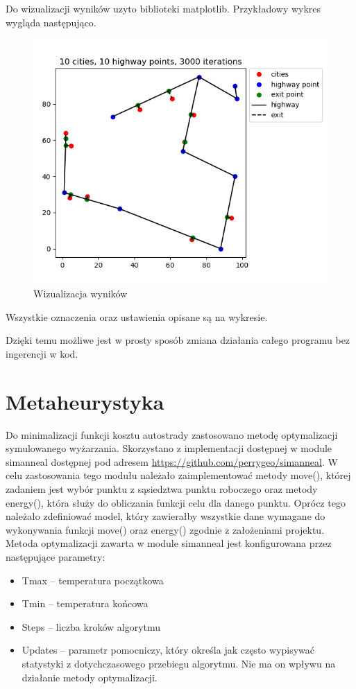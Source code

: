 \documentclass[a4paper]{article}
\begin{document}
Do wizualizacji wyników uzyto biblioteki matplotlib. Przykładowy wykres wygląda następująco.
\begin{figure}[h]
\centering
\includegraphics[width=12cm]{sample}
\caption{Wizualizacja wyników}
\end{figure}
Wszystkie oznaczenia oraz ustawienia opisane są na wykresie.



Dzięki temu możliwe jest w prosty sposób zmiana działania całego programu bez ingerencji w kod.


\section{Metaheurystyka}
Do minimalizacji funkcji kosztu autostrady zastosowano metodę optymalizacji symulowanego wyżarzania. Skorzystano z implementacji dostępnej w module simanneal dostępnej pod adresem \url{https://github.com/perrygeo/simanneal}. W celu zastosowania tego modułu należało zaimplementować metody move(), której zadaniem jest wybór punktu z sąsiedztwa punktu roboczego oraz metody energy(), która służy do obliczania funkcji celu dla danego punktu. Oprócz tego należało zdefiniować model, który zawierałby wszystkie dane wymagane do wykonywania funkcji move() oraz energy() zgodnie z założeniami projektu.
Metoda optymalizacji zawarta w module simanneal jest konfigurowana przez następujące parametry:
\begin{itemize}
\item Tmax – temperatura początkowa
\item Tmin – temperatura końcowa
\item Steps – liczba kroków algorytmu
\item Updates – parametr pomocniczy, który określa jak często wypisywać statystyki z dotychczasowego przebiegu algorytmu. Nie ma on wpływu na działanie metody optymalizacji.
\end{itemize}
\end{document}
